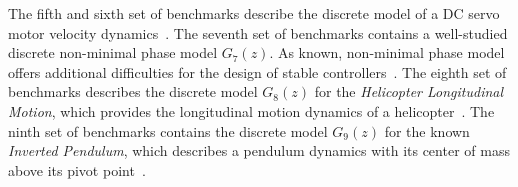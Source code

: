 \documentclass[final]{sig-alternate-05-2015}
\begin{document}
%
%
%
%
%
%
The fifth and sixth set of benchmarks describe the discrete model 
of a DC servo motor velocity dynamics~\cite{exampleCAD,Tan01}. 
%
The seventh set of benchmarks contains a well-studied discrete  
non-minimal phase model $G_{7}(z)$. As known, non-minimal phase model offers 
additional difficulties for the design of stable controllers~\cite{Doyle:1991:FCT:574259}. 
%
%
%
The eighth set of benchmarks describes the discrete model $G_{8}(z)$ for the \textit{Helicopter Longitudinal Motion},
which provides the longitudinal motion dynamics of a helicopter~\cite{Franklin15}. 
%
%
The ninth  set of benchmarks contains the discrete model $G_{9}(z)$ for the known \textit{Inverted Pendulum}, which 
describes a pendulum dynamics with its center of mass above its pivot point~\cite{Franklin15}. 
%
\end{document}
